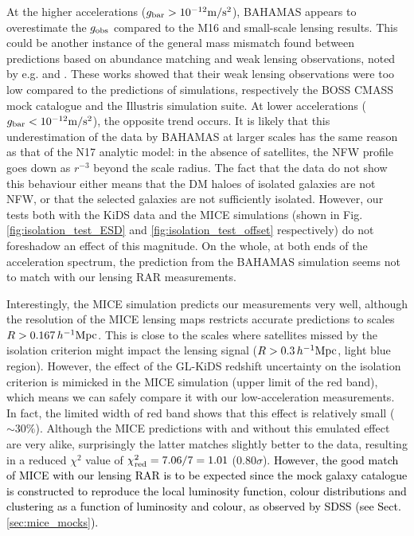 \documentclass[usenatbib]{mnras}
\newcommand{\hMpc}{\, h^{-1}{\rm{Mpc}} }
\newcommand{\mpss}{ {\rm m/s^2} }
\newcommand{\un}[1]{_{\rm #1}}
\begin{document}
At the higher accelerations ($g\un{bar}>10^{-12} \mpss$), BAHAMAS appears to overestimate the $g\un{obs}$ compared to the M16 and small-scale lensing results. This could be another instance of the general mass mismatch found between predictions based on abundance matching and weak lensing observations, noted by e.g. \cite{leauthaud2017} and \cite{svensmark2019}. These works showed that their weak lensing observations were too low compared to the predictions of simulations, respectively the BOSS CMASS mock catalogue and the Illustris simulation suite. At lower accelerations ($g\un{bar}<10^{-12} \mpss$), the opposite trend occurs. It is likely that this underestimation of the data by BAHAMAS at larger scales has the same reason as that of the N17 analytic model: in the absence of satellites, the NFW profile goes down as $r^{-3}$ beyond the scale radius. The fact that the data do not show this behaviour either means that the DM haloes of isolated galaxies are not NFW, or that the selected galaxies are not sufficiently isolated. However, our tests both with the KiDS data and the MICE simulations (shown in Fig. \ref{fig:isolation_test_ESD} and \ref{fig:isolation_test_offset} respectively) do not foreshadow an effect of this magnitude. On the whole, at both ends of the acceleration spectrum, the prediction from the BAHAMAS simulation seems not to match with our lensing RAR measurements.

Interestingly, the MICE simulation predicts our measurements very well, although the resolution of the MICE lensing maps restricts accurate predictions to scales $R > 0.167 \hMpc$. This is close to the scales where satellites missed by the isolation criterion might impact the lensing signal ($R > 0.3 \hMpc$, light blue region). However, the effect of the GL-KiDS redshift uncertainty on the isolation criterion is mimicked in the MICE simulation (upper limit of the red band), which means we can safely compare it with our low-acceleration measurements. In fact, the limited width of red band shows that this effect is relatively small ($\sim 30\%$). Although the MICE predictions with and without this emulated effect are very alike, surprisingly the latter matches slightly better to the data, resulting in a reduced $\chi^2$ value of $\chi\un{red}^2 = 7.06 / 7 = 1.01$ ($0.80 \sigma$). \textcolor{black}{However, the good match of MICE with our lensing RAR is to be expected since the mock galaxy catalogue is constructed to reproduce the local luminosity function, colour distributions and clustering as a function of luminosity and colour, as observed by SDSS (see Sect. \ref{sec:mice_mocks}).}
\end{document}
